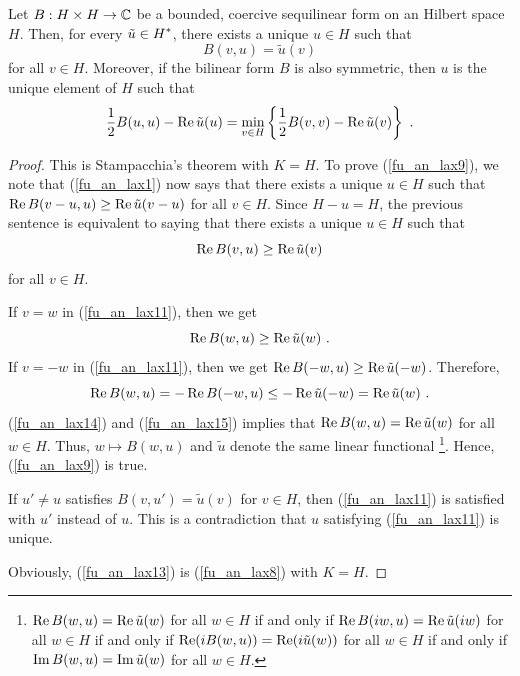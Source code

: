 \begin{cor} \label{fu_an_LaxMilgTh}
Let $B:H\times H\rightarrow \mathbb{C}$ be a bounded, coercive sequilinear form
on an Hilbert space $H$.  
Then, for every $\displaystyle \tilde{u} \in H^\ast$, there
exists a unique $u\in H$ such that
\begin{equation} \label{fu_an_lax9}
B(v,u) = \tilde{u}(v)
\end{equation}
for all $v \in H$.  Moreover, if the bilinear form $B$ is also
symmetric, then $u$ is the unique element of $H$ such that
\begin{equation} \label{fu_an_lax13}
\frac{1}{2}B(u,u) - \operatorname{Re} \tilde{u}(u) = \min_{v\in H} \left\{
\frac{1}{2}B(v,v) - \operatorname{Re} \tilde{u}(v) \right\} \  .
\end{equation}
\end{cor}

\begin{proof}
This is Stampacchia's theorem with $K=H$.  To prove
(\ref{fu_an_lax9}), we note that (\ref{fu_an_lax1}) now says that
there exists a unique $u\in H$ such that
$\displaystyle \operatorname{Re} B(v-u,u) \geq \operatorname{Re} \tilde{u}(v-u)$ for all $v\in H$.
Since $H-u = H$, the previous sentence is equivalent to saying that
there exists a unique $u\in H$ such that
\begin{equation} \label{fu_an_lax11}
\operatorname{Re} B(v,u) \geq \operatorname{Re} \tilde{u}(v)
\end{equation}
for all $v\in H$.
 
If $v = w$ in (\ref{fu_an_lax11}), then we get
\begin{equation}\label{fu_an_lax14}
\operatorname{Re} B(w,u) \geq \operatorname{Re} \tilde{u}(w) \ .
\end{equation}
If $v = -w$ in (\ref{fu_an_lax11}), then we get
$\operatorname{Re} B(-w,u) \geq \operatorname{Re} \tilde{u}(-w)$.
Therefore,
\begin{equation}\label{fu_an_lax15}
\RE B(w,u) = - \RE B(-w,u) \leq - \RE \tilde{u}(-w) = \RE \tilde{u}(w) \ .
\end{equation}
(\ref{fu_an_lax14}) and (\ref{fu_an_lax15}) implies that
$\displaystyle \operatorname{Re} B(w,u) = \operatorname{Re} \tilde{u}(w)$ for all $w \in H$.
Thus, $w\mapsto B(w,u)$ and $\tilde{u}$ denote the same linear
functional \footnote{
$\displaystyle \operatorname{Re} B(w,u) = \operatorname{Re} \tilde{u}(w)$ for all $w \in H$
if and only if
$\displaystyle \operatorname{Re} B(i w,u) = \operatorname{Re} \tilde{u}(iw)$ for all $w \in H$
if and only if
$\displaystyle \operatorname{Re} (i B(w,u)) = \operatorname{Re} (i\tilde{u}(w))$ for all $w \in H$
if and only if $\displaystyle \operatorname{Im} B(w,u) = \operatorname{Im} \tilde{u}(w)$ for all $w \in H$.
}.  Hence, (\ref{fu_an_lax9}) is true.

If $u' \neq u$ satisfies $B(v,u') = \tilde{u}(v)$ for $v \in H$, then 
(\ref{fu_an_lax11}) is satisfied with $u'$ instead of $u$.  This is a
contradiction that $u$ satisfying (\ref{fu_an_lax11}) is unique.

Obviously, (\ref{fu_an_lax13}) is (\ref{fu_an_lax8}) with $K = H$.
\end{proof}

